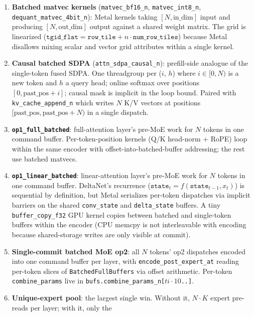 \documentclass[11pt,a4paper]{article}
\begin{document}
\begin{enumerate}
\item \textbf{Batched matvec kernels} (\texttt{matvec\_bf16\_n},
    \texttt{matvec\_int8\_n}, \texttt{dequant\_matvec\_4bit\_n}):
    Metal kernels taking $[N, \text{in\_dim}]$ input and producing
    $[N, \text{out\_dim}]$ output against a shared weight matrix. The
    grid is linearized
    ($\texttt{tgid\_flat} = \texttt{row\_tile} + n \cdot \texttt{num\_row\_tiles}$)
    because Metal disallows mixing scalar and vector grid attributes
    within a single kernel.
\item \textbf{Causal batched SDPA} (\texttt{attn\_sdpa\_causal\_n}):
    prefill-side analogue of the single-token fused SDPA. One
    threadgroup per ($i$, $h$) where $i \in [0, N)$ is a new token
    and $h$ a query head; online softmax over positions
    $[0, \text{past\_pos} + i]$; causal mask is implicit in the loop
    bound. Paired with \texttt{kv\_cache\_append\_n} which writes $N$
    K/V vectors at positions $[\text{past\_pos}, \text{past\_pos} + N)$
    in a single dispatch.
\item \textbf{\texttt{op1\_full\_batched}}: full-attention layer's
    pre-MoE work for $N$ tokens in one command buffer.
    Per-token-position kernels (Q/K head-norm + RoPE) loop within the
    same encoder with offset-into-batched-buffer addressing; the rest
    use batched matvecs.
\item \textbf{\texttt{op1\_linear\_batched}}: linear-attention layer's
    pre-MoE work for $N$ tokens in one command buffer. DeltaNet's
    recurrence ($\texttt{state}_t = f(\texttt{state}_{t-1}, x_t)$) is
    sequential by definition, but Metal serializes per-token
    dispatches via implicit barriers on the shared
    \texttt{conv\_state} and \texttt{delta\_state} buffers. A tiny
    \texttt{buffer\_copy\_f32} GPU kernel copies between batched and
    single-token buffers within the encoder (CPU memcpy is not
    interleavable with encoding because shared-storage writes are
    only visible at commit).
\item \textbf{Single-commit batched MoE op2}: all $N$ tokens' op2
    dispatches encoded into one command buffer per layer, with
    \texttt{encode\_post\_expert\_at} reading per-token slices of
    \texttt{BatchedFullBuffers} via offset arithmetic. Per-token
    \texttt{combine\_params} live in
    \texttt{bufs.combine\_params\_n[$ti \cdot 10$..]}.
\item \textbf{Unique-expert pool}: the largest single win. Without
    it, $N \cdot K$ expert pre-reads per layer; with it, only the

\end{enumerate}
\end{document}
